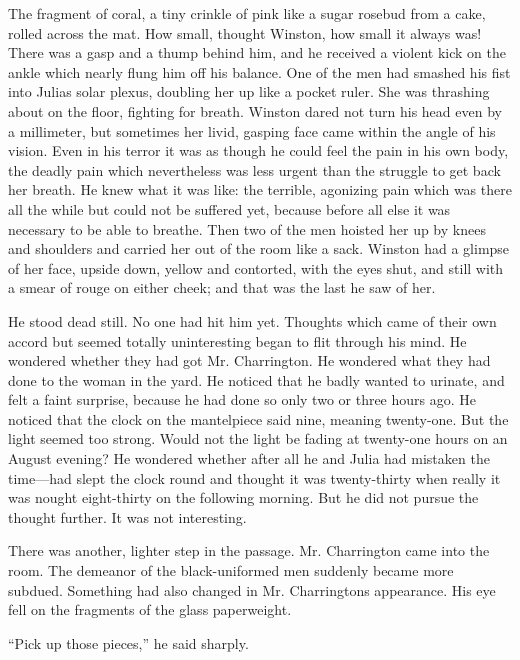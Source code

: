 The fragment of coral, a tiny crinkle of pink like a sugar rosebud from
a cake, rolled across the mat. How small, thought Winston, how small it
always was! There was a gasp and a thump behind him, and he received a
violent kick on the ankle which nearly flung him off his balance. One of
the men had smashed his fist into Julia\textquotesingle s solar plexus,
doubling her up like a pocket ruler. She was thrashing about on the
floor, fighting for breath. Winston dared not turn his head even by a
millimeter, but sometimes her livid, gasping face came within the angle
of his vision. Even in his terror it was as though he could feel the
pain in his own body, the deadly pain which nevertheless was less urgent
than the struggle to get back her breath. He knew what it was like: the
terrible, agonizing pain which was there all the while but could not be
suffered yet, because before all else it was necessary to be able to
breathe. Then two of the men hoisted her up by knees and shoulders and
carried her out of the room like a sack. Winston had a glimpse of her
face, upside down, yellow and contorted, with the eyes shut, and still
with a smear of rouge on either cheek; and that was the last he saw of
her.

He stood dead still. No one had hit him yet. Thoughts which came of
their own accord but seemed totally uninteresting began to flit through
his mind. He wondered whether they had got Mr. Charrington. He wondered
what they had done to the woman in the yard. He noticed that he badly
wanted to urinate, and felt a faint surprise, because he had done so
only two or three hours ago. He noticed that the clock on the
mantelpiece said nine, meaning twenty-one. But the light seemed too
strong. Would not the light be fading at twenty-one hours on an August
evening? He wondered whether after all he and Julia had mistaken the
time---had slept the clock round and thought it was twenty-thirty when
really it was nought eight-thirty on the following morning. But he did
not pursue the thought further. It was not interesting.

There was another, lighter step in the passage. Mr. Charrington came
into the room. The demeanor of the black-uniformed men suddenly became
more subdued. Something had also changed in Mr.
Charrington\textquotesingle s appearance. His eye fell on the fragments
of the glass paperweight.

``Pick up those pieces,'' he said sharply.

